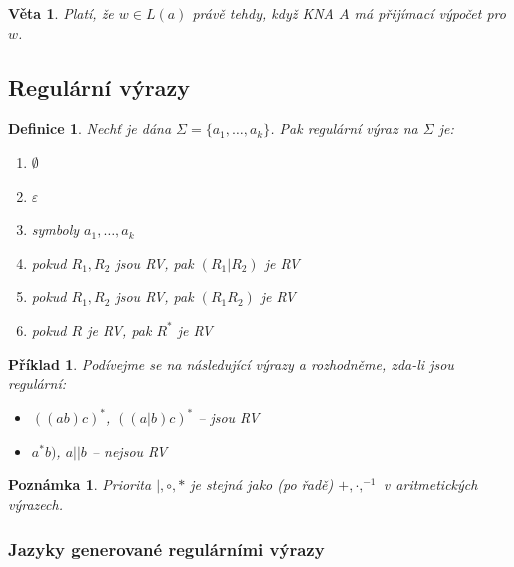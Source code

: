 \documentclass[10pt,a4paper]{article}
\theoremstyle{note}
\newtheorem{veta}{Věta}
\newtheorem{definice}{Definice}
\newtheorem{priklad}{Příklad}
\newtheorem{poznamka}{Poznámka}
\begin{document}
\begin{veta}
Platí, že $w \in L(a)$ právě tehdy, když KNA $A$ má přijímací výpočet pro $w$.
\end{veta}


	\subsection{Regulární výrazy}

\begin{definice}
Nechť je dána $\Sigma = \lbrace a_{1}, \ldots, a_{k} \rbrace$. Pak regulární výraz na $\Sigma$ je:
\begin{enumerate}
\item
$\emptyset$

\item
$\varepsilon$

\item
symboly $a_{1}, \ldots, a_{k}$

\item
pokud $R_{1}, R_{2}$ jsou RV, pak $(R_{1}|R_{2})$ je RV

\item
pokud $R_{1}, R_{2}$ jsou RV, pak $(R_{1}R_{2})$ je RV

\item
pokud $R$ je RV, pak $R^{*}$ je RV
\end{enumerate}
\end{definice}

\begin{priklad}
Podívejme se na následující výrazy a rozhodněme, zda-li jsou regulární:

\begin{itemize}
\item
$((ab)c)^{*}$, $((a|b)c)^{*}$ -- jsou RV

\item
$a^{*}b)$, $a||b$ -- nejsou RV
\end{itemize}
\end{priklad}
\begin{poznamka}
Priorita $| , \circ , *$ je stejná jako (po řadě) $+ , \cdot , ^{-1}$ v aritmetických výrazech.
\end{poznamka}
\subsubsection{Jazyky generované regulárními výrazy}
\end{document}

